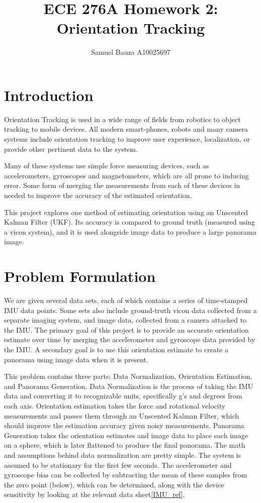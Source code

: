 \documentclass[a4paper]{article}
\title{ECE 276A Homework 2: Orientation Tracking}
\author{Samuel Bauza A10025697}
\begin{document}
\maketitle

\section{Introduction}

	Orientation Tracking is used in a wide range of fields from robotics to object tracking to mobile devices. All modern smart-phones, robots and many camera systems include orientation tracking to improve user experience, localization, or provide other pertinent data to the system.

	Many of these systems use simple force measuring devices, such as accelerometers, gyroscopes and magnetometers, which are all prone to inducing error. Some form of merging the measurements from each of these devices in needed to improve the accuracy of the estimated orientation.
    
    This project explores one method of estimating orientation using an Unscented Kalman Filter (UKF). Its accuracy is compared to ground truth (measured using a vicon system), and it is used alongside image data to produce a large panorama image.

\section{Problem Formulation}

	We are given several data sets, each of which contains a series of time-stamped IMU data points. Some sets also include ground-truth vicon data collected from a separate imaging system, and image data, collected from a camera attached to the IMU. The primary goal of this project is to provide an accurate orientation estimate over time by merging the accelerometer and gyroscope data provided by the IMU. A secondary goal is to use this orientation estimate to create a panorama using image data when it is present.

This problem contains three parts: Data Normalization, Orientation Estimation, and Panorama Generation. Data Normalization is the process of taking the IMU data and converting it to recognizable units, specifically g's and degrees from each axis. Orientation estimation takes the force and rotational velocity measurements and passes them through an Unscented Kalman Filter, which should improve the estimation accuracy given noisy measurements. Panorama Generation takes the orientation estimates and image data to place each image on a sphere, which is later flattened to produce the final panorama.
	The math and assumptions behind data normalization are pretty simple. The system is assumed to be stationary for the first few seconds. The accelerometer and gyroscope bias can be collected by subtracting the mean of these samples from the zero point (below), which can be determined, along with the device sensitivity by looking at the relevant data sheet\ref{IMU_ref}.
    
\end{document}
